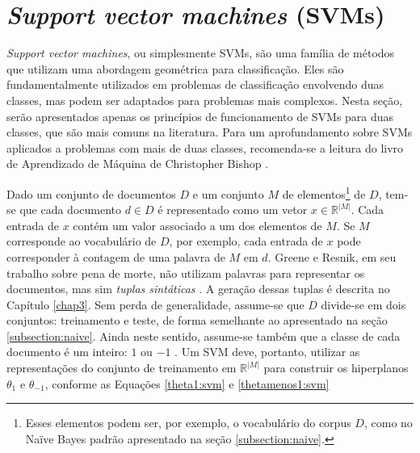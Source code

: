  

\section{\emph{Support vector machines} (SVMs)}
\label{subsection:SVMs}

\emph{Support vector machines}, ou simplesmente SVMs, são uma família de métodos que utilizam uma abordagem geométrica para classificação. Eles são fundamentalmente utilizados em problemas de classificação envolvendo duas classes, mas podem ser adaptados para problemas mais complexos. Nesta seção, serão apresentados apenas os princípios de funcionamento de SVMs para duas classes, que são mais comuns na literatura. Para um aprofundamento sobre SVMs aplicados a problemas com mais de duas classes, recomenda-se a leitura do livro de Aprendizado de Máquina de Christopher Bishop \cite{bishop}.

Dado um conjunto de documentos \ensuremath{D} e um conjunto \ensuremath{M} de elementos\footnote{Esses elementos podem ser, por exemplo, o vocabulário do corpus \ensuremath{D}, como no Naïve Bayes padrão apresentado na seção \ref{subsection:naive}.} de \ensuremath{D}, tem-se que cada documento \ensuremath{d \in D} é representado como um vetor \ensuremath{x \in \mathbb{R}^{|M|}}. Cada entrada de \ensuremath{x} contém um valor associado a um dos elementos de \ensuremath{M}. Se \ensuremath{M} corresponde ao vocabulário de \ensuremath{D}, por exemplo, cada entrada de \ensuremath{x} pode corresponder à contagem de uma palavra de \ensuremath{M} em \ensuremath{d}. Greene e Resnik, em seu trabalho sobre pena de morte, não utilizam palavras para representar os documentos, mas sim \emph{tuplas sintáticas} \cite{greene}. A geração dessas tuplas é descrita no Capítulo \ref{chap3}. Sem perda de generalidade, assume-se que \ensuremath{D} divide-se em dois conjuntos: treinamento e teste, de forma semelhante ao apresentado na seção \ref{subsection:naive}. Ainda neste sentido, assume-se também que a classe de cada documento é um inteiro: \ensuremath{1} ou \ensuremath{-1} \cite{mono-puc}. Um SVM deve, portanto, utilizar as representações do conjunto de treinamento em \ensuremath{\mathbb{R}^{|M|}} para construir os hiperplanos \ensuremath{\theta_1} e \ensuremath{\theta_{-1}}, conforme as Equações \ref{theta1:svm} e \ref{thetamenos1:svm} \cite{mono-puc}

